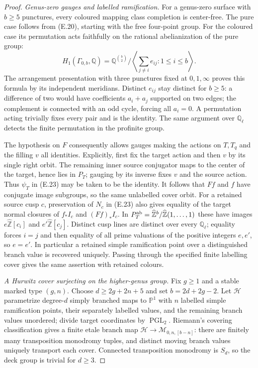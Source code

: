 \begin{proof}
\emph{Genus-zero gauges and labelled ramification.}
For a genus-zero surface with $b\geq5$ punctures, every
coloured mapping class completion is center-free.  The pure
case follows from (E.20), starting with the free four-point
group.  For the coloured case its permutation acts faithfully
on the rational abelianization of the pure group:
\[
 H_1(\Gamma_{0,b},\mathbb Q)=
 \mathbb Q^{\binom b2}/
 \left\langle\sum_{j\ne i}e_{ij}:1\leq i\leq b\right\rangle.
                                                               \tag{E.24}
\]
The arrangement presentation with three punctures fixed at
$0,1,\infty$ proves this formula by its independent meridians.
Distinct $e_{ij}$ stay distinct for $b\geq5$: a difference of
two would have coefficients $a_i+a_j$ supported on two edges;
the complement is connected with an odd cycle, forcing all
$a_i=0$.  A permutation acting trivially fixes every pair and
is the identity.  The same argument over $\mathbb Q_\ell$
detects the finite permutation in the profinite group.

The hypothesis on $F$ consequently allows gauges making the
actions on $T,T_q$ and the filling $v$ all identities.
Explicitly, first fix the target action and then $v$ by its
single right orbit.  The remaining inner source conjugator
maps to the center of the target, hence lies in $P_T$;
gauging by its inverse fixes $v$ and the source action.
Thus $\psi_T$ in (E.23) may be taken to be the identity.
It follows that $Ff$ and $f$ have conjugate image subgroups,
so the same unlabelled cover orbit.
For a retained source cusp $c$, preservation of $N_c$ in
(E.23) also gives equality of the target normal closures of
$f_*I_c$ and $(Ff)_*I_c$.  In
$P_T^{\rm ab}=\widehat{\mathbb Z}^{b}/
\widehat{\mathbb Z}(1,\ldots,1)$ these have images
$e\widehat{\mathbb Z}[c_i]$ and
$e'\widehat{\mathbb Z}[c_j]$.
Distinct cusp lines are distinct over every $\mathbb Q_\ell$;
equality forces $i=j$ and then equality of all prime valuations
of the positive integers $e,e'$, so $e=e'$.
In particular a retained simple ramification point over a
distinguished branch value is recovered uniquely.  Passing
through the specified finite labelling cover gives the same
assertion with retained colours.

\emph{A Hurwitz cover surjecting on the higher-genus group.}
Fix $g\geq1$ and a stable marked type $(g,n)$.  Choose
$d\geq2g+2n+5$ and set $b=2d+2g-2$.
Let $\mathcal H$ parametrize degree-$d$ simply branched maps
to $\mathbb P^1$ with $n$ labelled simple ramification points,
their separately labelled values, and the remaining branch
values unordered; divide target coordinates by
$\operatorname{PGL}_2$.
Riemann's covering classification gives a finite etale branch
map $\mathcal H\to\mathcal M_{0,n,[b-n]}$: there are finitely
many transposition monodromy tuples, and distinct moving
branch values uniquely transport each cover.  Connected
transposition monodromy is $S_d$, so the deck group is trivial
for $d\geq3$.


\end{proof}
